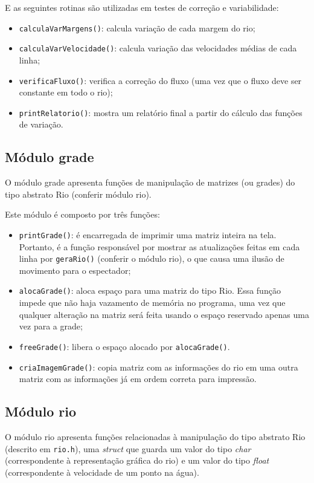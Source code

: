 \documentclass[11pt,a4paper]{article}
\begin{document}
E as seguintes rotinas são utilizadas em testes de correção e variabilidade:

\begin{itemize}
\item \verb|calculaVarMargens()|: calcula variação de cada margem do rio;
\item \verb|calculaVarVelocidade()|: calcula variação das velocidades médias de cada linha;
\item \verb|verificaFluxo()|: verifica a correção do fluxo (uma vez que o fluxo deve ser constante em todo o rio);
\item \verb|printRelatorio()|: mostra um relatório final a partir do cálculo das funções de variação.
\end{itemize}

\subsection{Módulo grade}
O módulo grade apresenta funções de manipulação de matrizes (ou grades) do tipo abstrato Rio (conferir módulo rio).

Este módulo é composto por três funções:
\begin{itemize}
\item \verb|printGrade()|: é encarregada de imprimir uma matriz inteira na tela. Portanto, é a função responsável por mostrar as atualizações feitas em cada linha por \verb|geraRio()| (conferir o módulo rio), o que causa uma ilusão de movimento para o espectador;
\item \verb|alocaGrade()|: aloca espaço para uma matriz do tipo Rio. Essa função impede que não haja vazamento de memória no programa, uma vez que qualquer alteração na matriz será feita usando o espaço reservado apenas uma vez para a grade;
\item \verb|freeGrade()|: libera o espaço alocado por \verb|alocaGrade()|.
\item \verb|criaImagemGrade()|: copia matriz com as informações do rio em uma outra matriz com as informações já em ordem correta para impressão.
\end{itemize}

\subsection{Módulo rio}
O módulo rio apresenta funções relacionadas à manipulação do tipo abstrato Rio (descrito em \verb|rio.h|), uma \textit{struct} que guarda um valor do tipo \textit{char} (correspondente à representação gráfica do rio) e um valor do tipo \textit{float} (correspondente à velocidade de um ponto na água). \\
\end{document}
